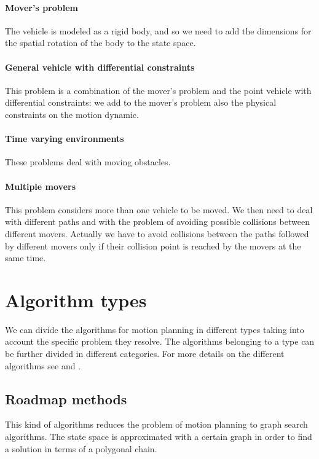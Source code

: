 \documentclass[dissertation.tex]{subfiles}
\begin{document}
\paragraph{Mover's problem}
The vehicle is modeled as a rigid body, and so we need to add the
dimensions for the spatial rotation of the body to the state
space.

\paragraph{General vehicle with differential constraints}
This problem is a combination of the mover's problem and the point vehicle with
differential constraints: we add to the mover's
problem also the physical constraints on the motion dynamic.

\paragraph{Time varying environments}
These problems deal with moving obstacles.

\paragraph{Multiple movers}
This problem considers more than one vehicle to be moved. We then need
to deal
with different paths and with the problem of avoiding possible
collisions between different movers. Actually we have to avoid
collisions between the paths followed by different movers only if
their collision point is reached by the movers at the same time.

\section{Algorithm types}
We can divide the algorithms for motion planning in different types
taking into account the specific problem they resolve. The algorithms
belonging to a type can be further divided
in different categories.
For more details on the different algorithms see \cite{goerzen} and
\cite{choset}.

\subsection{Roadmap methods}
This kind of algorithms reduces the problem of motion planning to
graph search algorithms. The state space is approximated with a
certain graph in order to find a solution in terms of a polygonal
chain.
\end{document}
